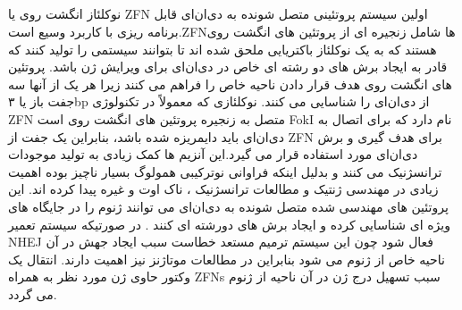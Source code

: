 \documentclass[12pt,a4paper,BCOR=.7cm,headsepline,bibliography=totoc]{report}
\begin{document}
\subsection{}

نوکلئاز انگشت روی یا ZFN اولین سیستم پروتئینی متصل شونده به دی‌ان‌ای قابل برنامه ریزی با کاربرد وسیع است.ZFNها شامل زنجیره ای از پروتئین های انگشت روی هستند که به یک نوکلئاز باکتریایی ملحق شده اند تا بتوانند سیستمی را تولید کنند که قادر به ایجاد برش های دو رشته ای خاص در دی‌ان‌ای برای ویرایش ژن باشد. پروتئین های انگشت روی هدف قرار دادن ناحیه خاص را فراهم می کنند زیرا هر یک از آنها سه جفت باز یا ۳bp از دی‌ان‌ای را شناسایی می کنند. نوکلئازی که معمولاً در تکنولوژی ZFN متصل به زنجیره پروتئین های انگشت روی است FokI نام دارد که برای اتصال به دی‌ان‌ای باید دایمریزه شده باشد، بنابراین یک جفت از ZFN برای هدف گیری و برش دی‌ان‌ای مورد استفاده قرار می گیرد.این آنزیم ها کمک زیادی به تولید موجودات ترانسژنیک می کنند و بدلیل اینکه فراوانی نوترکیبی همولوگ بسیار ناچیز بوده اهمیت زیادی در مهندسی ژنتیک و مطالعات ترانسژنیک ، ناک اوت و غیره پیدا کرده اند. این پروتئین های مهندسی شده متصل شونده به دی‌ان‌ای می توانند ژنوم را در جایگاه های ویژه ای شناسایی کرده و ایجاد برش های دورشته ای کنند . در صورتیکه سیستم تعمير NHEJ فعال شود چون این سیستم ترمیم مستعد خطاست سبب ایجاد جهش در آن ناحیه خاص از ژنوم می شود بنابراین در مطالعات موتاژنز نیز اهمیت دارند. انتقال یک وکتور حاوی ژن مورد نظر به همراه ZFNs سبب تسهیل درج ژن در آن ناحیه از ژنوم می گردد.
\end{document}
